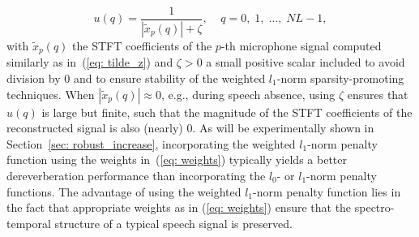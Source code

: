 \documentclass[10pt]{IEEEtran}
\begin{document}
\begin{equation}
\label{eq: weights}
u(q) = \frac{1}{|\tilde{x}_p(q)| + \zeta}, \; \; \; \; q = 0, \; 1, \; \ldots, \; NL-1,
\end{equation}
with $\tilde{x}_p(q)$ the STFT coefficients of the $p$-th microphone signal computed similarly as in~(\ref{eq: tilde_z}) and $\zeta > 0$ a small positive scalar included to avoid division by $0$ and to ensure stability of the weighted $l_1$-norm sparsity-promoting techniques.
When $|\tilde{x}_p(q)| \approx 0$, e.g., during speech absence, using $\zeta$ ensures that $u(q)$ is large but finite, such that the magnitude of the STFT coefficients of the reconstructed signal is also (nearly) $0$.
As will be experimentally shown in Section~\ref{sec: robust_increase}, incorporating the weighted $l_1$-norm penalty function using the weights in~(\ref{eq: weights}) typically yields a better dereverberation performance than incorporating the $l_0$- or $l_1$-norm penalty functions.
The advantage of using the weighted $l_1$-norm penalty function lies in the fact that appropriate weights as in (\ref{eq: weights}) ensure that the spectro-temporal structure of a typical speech signal is preserved.
\end{document}
